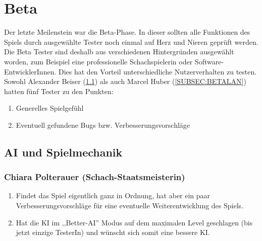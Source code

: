 \documentclass[12pt,a4paper]{article}
\begin{document}
\clearpage\vfill\newpage{}
\section{Beta}
\label{SEC:beta}

Der letzte Meilenstein war die Beta-Phase. In dieser sollten alle Funktionen des Spiels durch ausgewählte Tester noch einmal auf Herz und Nieren geprüft werden. Die Beta Tester sind deshalb aus verschiedenen Hintergründen ausgewählt worden, zum Beispiel eine professionelle Schachspielerin oder Software-EntwicklerInnen. Dies hat den Vorteil unterschiedliche Nutzerverhalten zu testen. \\[1ex]
Sowohl Alexander Beiser (\ref{SUBSEC:BETAGAME}) als auch Marcel Huber (\ref{SUBSEC:BETALAN}) hatten fünf Tester zu den Punkten:
\begin{enumerate}[I]
	\item{Generelles Spielgefühl}
	\item{Eventuell gefundene Bugs bzw. Verbesserungsvorschläge}
\end{enumerate}

\subsection{AI und Spielmechanik}
\label{SUBSEC:BETAGAME}

\subsubsection*{Chiara Polterauer (Schach-Staatsmeisterin)}
\begin{enumerate}[I]
	\item{Findet das Spiel eigentlich ganz in Ordnung, hat aber ein paar Verbesserungsvorschläge für eine eventuelle Weiterentwicklung des Spiels.}
	\item{Hat die KI im ,,Better-AI'' Modus auf dem maximalen Level geschlagen (bis jetzt einzige TesterIn) und wünscht sich somit eine bessere KI. }
\end{enumerate}
\end{document}
